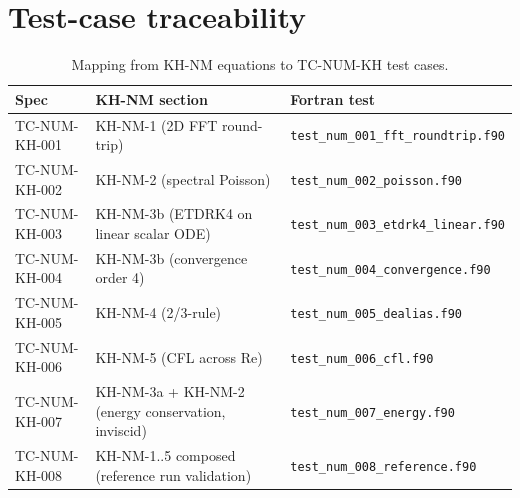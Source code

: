 \documentclass[11pt,a4paper]{article}
\theoremstyle{definition}
\theoremstyle{plain}
\begin{document}
\section{Test-case traceability}

\begin{table}[h]
\centering
\caption{Mapping from KH-NM equations to TC-NUM-KH test cases.}
\begin{tabular}{lll}
\toprule
\textbf{Spec} & \textbf{KH-NM section} & \textbf{Fortran test} \\
\midrule
TC-NUM-KH-001 & KH-NM-1 (2D FFT round-trip)            & \texttt{test\_num\_001\_fft\_roundtrip.f90} \\
TC-NUM-KH-002 & KH-NM-2 (spectral Poisson)              & \texttt{test\_num\_002\_poisson.f90} \\
TC-NUM-KH-003 & KH-NM-3b (ETDRK4 on linear scalar ODE) & \texttt{test\_num\_003\_etdrk4\_linear.f90} \\
TC-NUM-KH-004 & KH-NM-3b (convergence order 4)          & \texttt{test\_num\_004\_convergence.f90} \\
TC-NUM-KH-005 & KH-NM-4 (2/3-rule)                       & \texttt{test\_num\_005\_dealias.f90} \\
TC-NUM-KH-006 & KH-NM-5 (CFL across Re)                  & \texttt{test\_num\_006\_cfl.f90} \\
TC-NUM-KH-007 & KH-NM-3a + KH-NM-2 (energy conservation, inviscid) & \texttt{test\_num\_007\_energy.f90} \\
TC-NUM-KH-008 & KH-NM-1..5 composed (reference run validation) & \texttt{test\_num\_008\_reference.f90} \\
\bottomrule
\end{tabular}
\end{table}

\printbibliography
\end{document}
